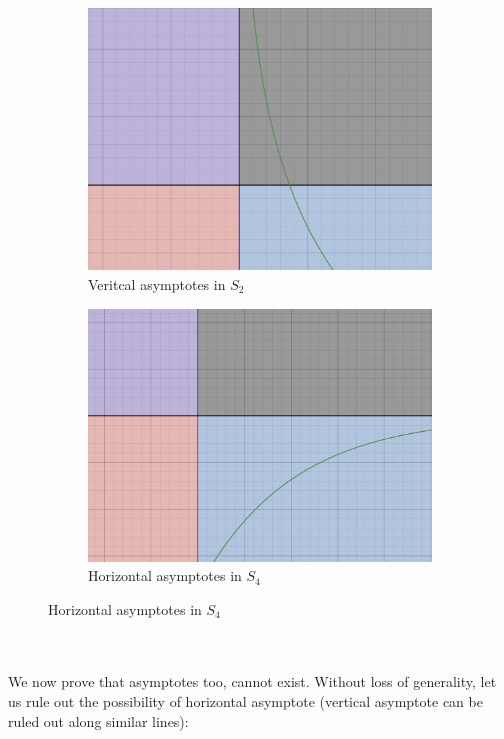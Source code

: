 \documentclass{article}
\begin{document}
\begin{figure}[h]
    \centering
    \begin{subfigure}[h]{0.4\textwidth}
        \centering
        \includegraphics[width = \textwidth]{vertical.png}
        \caption{Veritcal asymptotes in $S_2$}
    \end{subfigure}
    \hfill
    \begin{subfigure}[h]{0.4\textwidth}
        \centering
        \includegraphics[width = \textwidth]{horizontal.png}
        \caption{Horizontal asymptotes in $S_4$}
    \end{subfigure}
\end{figure}
\\
\\
We now prove that asymptotes too, cannot exist. Without loss of generality, let us rule out the possibility of horizontal asymptote (vertical asymptote can be ruled out along similar lines):
\end{document}
